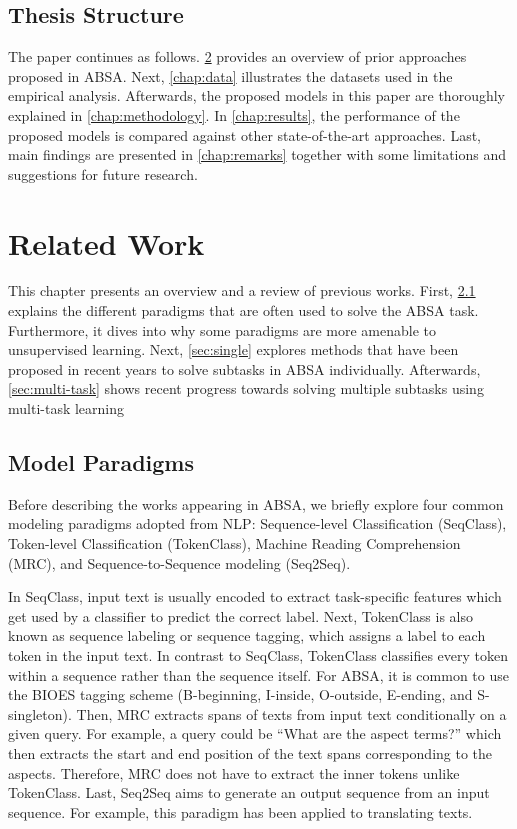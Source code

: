\documentclass[american, oneside]{ecsgdp}
\begin{document}
\section{Thesis Structure} \label{sec:structure}
The paper continues as follows. \cref{chap:related_work} provides an overview of prior approaches proposed in ABSA. Next, \cref{chap:data} illustrates the datasets used in the empirical analysis. Afterwards, the proposed models in this paper are thoroughly explained in \cref{chap:methodology}. In \cref{chap:results}, the performance of the proposed models is compared against other state-of-the-art approaches. Last, main findings are presented in \cref{chap:remarks} together with some limitations and suggestions for future research.

\chapter{Related Work} \label{chap:related_work}
This chapter presents an overview and a review of previous works. First, \cref{sec:paradigms} explains the different paradigms that are often used to solve the ABSA task. Furthermore, it dives into why some paradigms are more amenable to unsupervised learning. Next, \cref{sec:single} explores methods that have been proposed in recent years to solve subtasks in ABSA individually. Afterwards, \cref{sec:multi-task} shows recent progress towards solving multiple subtasks using multi-task learning 

\section{Model Paradigms} \label{sec:paradigms}
Before describing the works appearing in ABSA, we briefly explore four common modeling paradigms adopted from NLP: Sequence-level Classification (SeqClass), Token-level Classification (TokenClass), Machine Reading Comprehension (MRC), and Sequence-to-Sequence modeling (Seq2Seq).

In SeqClass, input text is usually encoded to extract task-specific features which get used by a classifier to predict the correct label. Next, TokenClass is also known as sequence labeling or sequence tagging, which assigns a label to each token in the input text. In contrast to SeqClass, TokenClass classifies every token within a sequence rather than the sequence itself. For ABSA, it is common to use the BIOES tagging scheme (B-beginning, I-inside, O-outside, E-ending, and S-singleton). Then, MRC extracts spans of texts from input text conditionally on a given query. For example, a query could be ``What are the aspect terms?'' which then extracts the start and end position of the text spans corresponding to the aspects. Therefore, MRC does not have to extract the inner tokens unlike TokenClass. Last, Seq2Seq aims to generate an output sequence from an input sequence. For example, this paradigm has been applied to translating texts.
\end{document}

